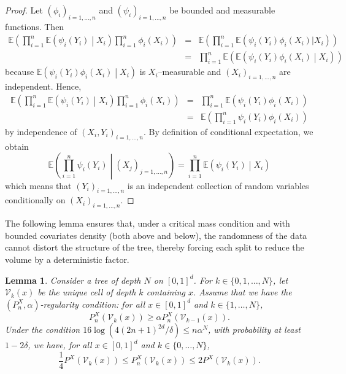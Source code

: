 \documentclass[paper=a4, fontsize=11pt]{scrartcl}
\newcommand{\EE}{\mathbb{E}}
\newtheorem{lemma}[theorem]{Lemma}
\begin{document}
\begin{proof}
    Let $(\phi_i)_{i=1, \dots,n}$ and $(\psi_i)_{i=1, \dots,n}$ be bounded and measurable functions. Then
    \begin{eqnarray*}
    \EE\left( \prod_{i=1}^n \EE\left(\psi_i(Y_i) \middle| X_i \right) \prod_{i=1}^n \phi_i(X_i)\right) &=& \EE\left(\prod_{i=1}^n \EE\left( \psi_i(Y_i) \phi_i (X_i)  | X_i\right)  \right) \\ &=& \prod_{i=1}^n \EE\left( \EE\left( \psi_i(Y_i) \phi_i (X_i) \middle| X_i \right) \right)
    \end{eqnarray*}
because $\EE\left( \psi_i(Y_i) \phi_i (X_i) \middle| X_i \right)$ is $X_i$--measurable and $(X_i)_{i=1,\dots,n}$ are independent. Hence,
    \begin{eqnarray*}
    \EE\left( \prod_{i=1}^n \EE\left(\psi_i(Y_i) \middle| X_i \right) \prod_{i=1}^n \phi_i(X_i)\right) &=& \prod_{i=1}^n \EE\left(\psi_i(Y_i) \phi_i(X_i)\right) \\ &=& \EE\left(\prod_{i=1}^n \psi_i(Y_i) \phi_i(X_i) \right)
    \end{eqnarray*}
by independence of $(X_i, Y_i)_{i=1,\dots,n}$. By definition of conditional expectation, we obtain 
    $$\EE\left(\prod_{i=1}^n \psi_i(Y_i) \middle| (X_j)_{j=1,\dots,n} \right) = \prod_{i=1}^n \EE\left(\psi_i(Y_i) \middle| X_i \right)$$
which means that $(Y_i)_{i=1,\dots,n}$ is an independent collection of random variables conditionally on $(X_i)_{i=1,\dots,n}.$
\end{proof}


The following lemma ensures that, under a critical mass condition and with bounded covariates density (both above and below), the randomness of the data cannot distort the structure of the tree, thereby forcing each split to reduce the volume by a deterministic factor.


\begin{lemma}\label{lemmaWager0}
Consider a tree of depth $N$ on $[0,1]^d$. For $k \in  \{0,1,\dots,N \}$, let $\mathcal{V}_k(x)$ be the unique cell of depth $k$ containing $x$. Assume that we have the $( P^X_n,\alpha)$-regularity condition: for all $x\in [0,1]^d$ and  $k \in \{1,\ldots,  N\} $, $$  P_n^X(\mathcal{V}_{k}(x))  \ge \alpha P_n^X(\mathcal{V}_{k-1}(x)).$$ 
Under the condition $16\log( 4 (2n+1)^{2d} / \delta) \leq n \alpha^{N}$, with probability at least $1 - 2\delta$,  we have, for all $x\in [0,1]^d$ and $k \in  \{0,\dots,N \}$, 
$$  \frac{1}{ 4}    P ^X (\mathcal{V}_{k}(x))  \leq  P^X_n(\mathcal{V}_{k}(x))\leq 2 P^X (\mathcal{V}_{k}(x)) . $$
\end{lemma}
\end{document}
